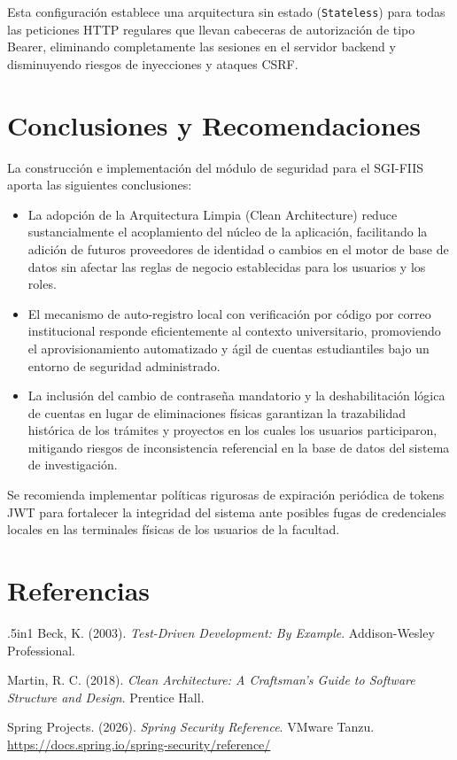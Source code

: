 \documentclass[12pt,letterpaper]{article}
\begin{document}
Esta configuración establece una arquitectura sin estado (\texttt{Stateless}) para todas las peticiones HTTP regulares que llevan cabeceras de autorización de tipo Bearer, eliminando completamente las sesiones en el servidor backend y disminuyendo riesgos de inyecciones y ataques CSRF.

\newpage

\section{Conclusiones y Recomendaciones}
La construcción e implementación del módulo de seguridad para el SGI-FIIS aporta las siguientes conclusiones:
\begin{itemize}
    \item La adopción de la Arquitectura Limpia (Clean Architecture) reduce sustancialmente el acoplamiento del núcleo de la aplicación, facilitando la adición de futuros proveedores de identidad o cambios en el motor de base de datos sin afectar las reglas de negocio establecidas para los usuarios y los roles.
    \item El mecanismo de auto-registro local con verificación por código por correo institucional responde eficientemente al contexto universitario, promoviendo el aprovisionamiento automatizado y ágil de cuentas estudiantiles bajo un entorno de seguridad administrado.
    \item La inclusión del cambio de contraseña mandatorio y la deshabilitación lógica de cuentas en lugar de eliminaciones físicas garantizan la trazabilidad histórica de los trámites y proyectos en los cuales los usuarios participaron, mitigando riesgos de inconsistencia referencial en la base de datos del sistema de investigación.
\end{itemize}

Se recomienda implementar políticas rigurosas de expiración periódica de tokens JWT para fortalecer la integridad del sistema ante posibles fugas de credenciales locales en las terminales físicas de los usuarios de la facultad.

\newpage

\section{Referencias}
\begin{refcontext}
\begin{hangparas}{.5in}{1}
Beck, K. (2003). \textit{Test-Driven Development: By Example}. Addison-Wesley Professional.

Martin, R. C. (2018). \textit{Clean Architecture: A Craftsman's Guide to Software Structure and Design}. Prentice Hall.


Spring Projects. (2026). \textit{Spring Security Reference}. VMware Tanzu. \url{https://docs.spring.io/spring-security/reference/}
\end{hangparas}
\end{refcontext}
\end{document}
